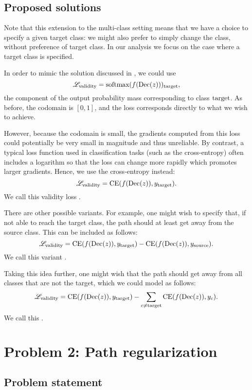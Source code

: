 \documentclass[../main.tex]{subfiles}
\begin{document}
\subsection{Proposed solutions}

Note that this extension to the multi-class setting means that we have a choice to specify a given target class: we might also prefer to simply change the class, without preference of target class. In our analysis we focus on the case where a target class is specified.

In order to mimic the solution discussed in \cite{cohenGifsplanation2022}, we could use
$$\mathscr{L}_\text{validity} = \text{softmax}(f(\operatorname{Dec}(z)))_{\mathrm{target}},$$
\ie{} the component of the output probability mass corresponding to class $\mathrm{target}$.
As before, the codomain is $[0, 1]$, and the loss corresponds directly to what we wish to achieve.


However, because the codomain is small, the gradients computed from this loss could potentially be very small in magnitude and thus unreliable.
By contrast, a typical loss function used in classification tasks (such as the cross-entropy) often includes a logarithm so that the loss can change more rapidly which promotes larger gradients. \citenote{}
Hence, we use the cross-entropy instead: $$\mathscr{L}_\text{validity} = \text{CE}(f(\operatorname{Dec}(z)), y_{\mathrm{target}}).$$
We call this validity loss .

There are other possible variants. For example, one might wish to specify that, if not able to reach the target class, the path should at least get away from the source class. This can be included as follows:
$$\mathscr{L}_\text{validity} = \text{CE}(f(\operatorname{Dec}(z)), y_{\mathrm{target}}) - \text{CE}(f(\operatorname{Dec}(z)), y_{\mathrm{source}}).$$
We call this variant .

Taking this idea further, one might wish that the path should get away from all classes that are not the target, which we could model as follows:
$$\mathscr{L}_\text{validity} = \text{CE}(f(\operatorname{Dec}(z)), y_{\mathrm{target}}) - \sum_{c \neq \mathrm{target}} \text{CE}(f(\operatorname{Dec}(z)), y_c).$$
We call this . 


\section{Problem 2: Path regularization}

\subsection{Problem statement}
\end{document}
